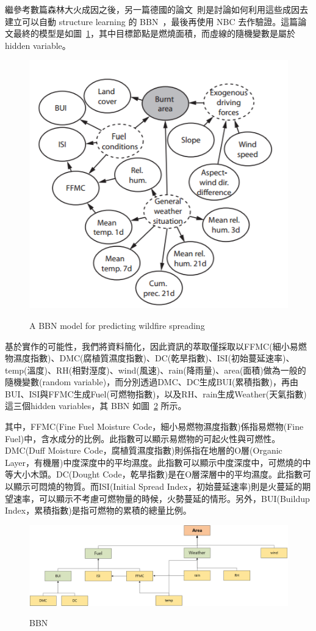 \documentclass[a4paper]{article}
\begin{document}
繼參考數篇森林大火成因之後，另一篇德國的論文~\cite{BBN}則是討論如何利用這些成因去建立可以自動 structure learning 的 BBN~\cite{Model}，最後再使用 NBC 去作驗證。這篇論文最終的模型是如圖~\ref{bbn_proto}，其中目標節點是燃燒面積，而虛線的隨機變數是屬於 hidden variable。

\begin{figure}[h]
  \caption{A BBN model for predicting wildfire spreading}
  \centering
  \includegraphics[width=.78\textwidth]{bbn_proto}
  \label{bbn_proto}
\end{figure}

基於實作的可能性，我們將資料簡化，因此資訊的萃取僅採取以FFMC(細小易燃物濕度指數)、DMC(腐植質濕度指數)、DC(乾旱指數)、ISI(初始蔓延速率)、temp(溫度)、RH(相對溼度)、wind(風速)、rain(降雨量)、area(面積)做為一般的隨機變數(random variable)，而分別透過DMC、DC生成BUI(累積指數)，再由BUI、ISI與FFMC生成Fuel(可燃物指數)，以及RH、rain生成Weather(天氣指數)這三個hidden variables，其 BBN 如圖~\ref{bbn} 所示。

其中，FFMC(Fine Fuel Moisture Code，細小易燃物濕度指數)係指易燃物(Fine Fuel)中，含水成分的比例。此指數可以顯示易燃物的可起火性與可燃性。DMC(Duff Moisture Code，腐植質濕度指數)則係指在地層的O層(Organic Layer，有機層)中度深度中的平均濕度。此指數可以顯示中度深度中，可燃燒的中等大小木頭。DC(Dought Code，乾旱指數)是在O層深層中的平均濕度。此指數可以顯示可悶燒的物質。而ISI(Initial Spread Index，初始蔓延速率)則是火蔓延的期望速率，可以顯示不考慮可燃物量的時候，火勢蔓延的情形。另外，BUI(Buildup Index，累積指數)是指可燃物的累積的總量比例。

\begin{figure}[h]
  \caption{BBN}
  \centering
  \includegraphics[width=1\textwidth]{bbn}
  \label{bbn}
\end{figure}
\end{document}
